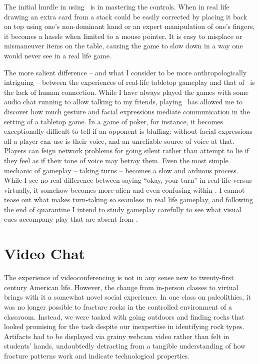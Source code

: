 \documentclass[russian,american]{../../../coursework}
\newcommand{\tbl}{\citetitle{Tabletop}}
\begin{document}
The initial hurdle in using \tbl\ is in mastering the controls. When in real life drawing
an extra card from a stack could be easily corrected by placing it back on top using one's
non-dominant hand or an expert manipulation of one's fingers, it becomes a hassle when
limited to a mouse pointer. It is easy to misplace or mismaneuver items on the table,
causing the game to slow down in a way one would never see in a real life game.

The more salient difference -- and what I consider to be more anthropologically
intriguing -- between the experiences of real-life tabletop gameplay and that of
\tbl\ is the lack of human connection. While I have always played the games with
some audio chat running to allow talking to my friends, playing \tbl\ has
allowed me to discover how much gesture and facial expressions mediate communication
in the setting of a tabletop game. In a game of poker, for instance, it becomes exceptionally
difficult to tell if an opponent is bluffing: without facial expressions all a player can
use is their voice, and an unreliable source of voice at that. Players can feign network
problems for going silent rather than attempt to lie if they feel as if their tone
of voice may betray them. Even the most simple mechanic of gameplay -- taking turns -- becomes
a slow and arduous process. While I see no real difference between saying \enquote{okay,
your turn} in real life versus virtually, it somehow becomes more alien and even
confusing within \tbl. I cannot tease out what makes turn-taking so seamless in real
life gameplay, and following the end of quarantine I intend to study gameplay carefully
to see what visual cues accompany play that are absent from \tbl.

\section{Video Chat}

The experience of videoconferencing is not in any sense new to twenty-first century
American life. However, the change from in-person classes to virtual brings with
it a somewhat novel social experience. In one class on paleolithics, it was no
longer possible to fracture rocks in the controlled environment of a classroom.
Instead, we were tasked with going outdoors and finding rocks that looked promising
for the task despite our inexpertise in identifying rock types.
Artifacts had to be displayed via grainy webcam video rather than felt in students'
hands, undoubtedly detracting from a tangible understanding of how fracture
patterns work and indicate technological properties.
\end{document}
